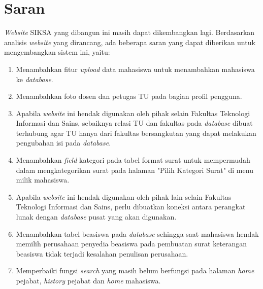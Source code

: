 \section{Saran}
\label{sec:saran}
\textit{Website} SIKSA yang dibangun ini masih dapat dikembangkan lagi. Berdasarkan analisis \textit{website} yang dirancang, ada beberapa saran yang dapat diberikan untuk mengembangkan sistem ini, yaitu:
\begin{enumerate}
	\item Menambahkan fitur \textit{upload} data mahasiswa untuk menambahkan mahasiswa ke \textit{database}.
	\item Menambahkan foto dosen dan petugas TU pada bagian profil pengguna.
	\item Apabila \textit{website} ini hendak digunakan oleh pihak selain Fakultas Teknologi Informasi dan Sains, sebaiknya relasi TU dan fakultas pada \textit{database} dibuat terhubung agar TU hanya dari fakultas bersangkutan yang dapat melakukan pengubahan isi pada \textit{database}.
	\item Menambahkan \textit{field} kategori pada tabel format surat untuk mempermudah dalam mengkategorikan surat pada halaman "Pilih Kategori Surat" di menu milik mahasiswa.
	\item Apabila \textit{website} ini hendak digunakan oleh pihak lain selain Fakultas Teknologi Informasi dan Sains, perlu dibuatkan koneksi antara perangkat lunak dengan \textit{database} pusat yang akan digunakan.
	\item Menambahkan tabel beasiswa pada \textit{database} sehingga saat mahasiswa hendak memilih perusahaan penyedia beasiswa pada pembuatan surat keterangan beasiswa tidak terjadi kesalahan penulisan perusahaan.
	\item Memperbaiki fungsi \textit{search} yang masih belum berfungsi pada halaman \textit{home} pejabat, \textit{history} pejabat dan \textit{home} mahasiswa.  
\end{enumerate}